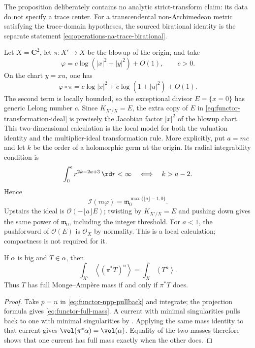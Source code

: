 The proposition deliberately contains no analytic strict-transform claim:
its data do not specify a trace center.  For a transcendental
non-Archimedean metric satisfying the trace-domain hypotheses, the sourced
birational identity is the separate statement
\eqref{eq:operations-na-trace-birational}.

\begin{example}
\label{ex:functor-blowup-jacobian}
Let $X=\mathbf C^2$, let $\pi:X'\to X$ be the blowup of the origin, and
take
\[
                  \varphi=c\log(|x|^2+|y|^2)+O(1),
                  \qquad c>0.
\]
On the chart $y=xu$, one has
\[
 \varphi\circ\pi
   =c\log|x|^2+c\log(1+|u|^2)+O(1).
\]
The second term is locally bounded, so the exceptional divisor $E=\{x=0\}$
has generic Lelong number $c$. Since $K_{X'/X}=E$, the extra copy of
$E$ in \eqref{eq:functor-transformation-ideal} is precisely the Jacobian
factor $|x|^2$ of the blowup chart. This two-dimensional calculation is
the local model for both the valuation identity and the multiplier-ideal
transformation rule. More explicitly, put $a=mc$ and let
$k$ be the order of a holomorphic germ at the origin. Its radial
integrability condition is
\[
 \int_0^\epsilon r^{2k-2a+3}\,\rd r<\infty
 \quad\Longleftrightarrow\quad k>a-2.
\]
Hence
\[
 \mathcal I(m\varphi)=\mathfrak m_0^{\max\{\lfloor a\rfloor-1,0\}}.
\tag{67.4c}\label{eq:functor-blowup-multiplier-example}
\]
Upstairs the ideal is $\mathcal O(-\lfloor a\rfloor E)$; twisting by
$K_{X'/X}=E$ and pushing down gives the same power of $\mathfrak m_0$,
including the integer threshold. For $a<1$, the pushforward of
$\mathcal O(E)$ is $\mathcal O_X$ by normality. This is a local calculation;
compactness is not required for it.
\end{example}

\begin{corollary}\label{cor:functor-full-mass-birational}
If $\alpha$ is big and $T\in\alpha$, then
\[
 \int_{X'}\left\langle(\pi^*T)^n\right\rangle
       =
 \int_X\left\langle T^n\right\rangle.
\tag{67.5}\label{eq:functor-full-mass}
\]
Thus $T$ has full Monge--Amp\`ere mass if and only if $\pi^*T$
does.
\end{corollary}

\begin{proof}
Take $p=n$ in \eqref{eq:functor-npp-pullback} and integrate; the
projection formula gives \eqref{eq:functor-full-mass}.  A current with minimal singularities pulls back to one with minimal
singularities by \cite[Proposition~1.12]{BEGZ10}. Applying the same mass
identity to that current gives
$\vol(\pi^*\alpha)=\vol(\alpha)$.  Equality of the two masses therefore
shows that one current has full mass exactly when the other does.
\end{proof}

